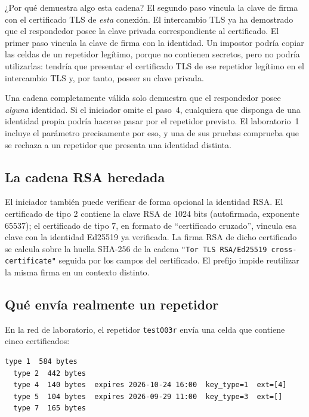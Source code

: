 ¿Por qué demuestra algo esta cadena? El segundo paso vincula la clave de firma con el certificado TLS de \emph{esta} conexión. El intercambio TLS ya ha demostrado que el respondedor posee la clave privada correspondiente al certificado. El primer paso vincula la clave de firma con la identidad. Un impostor podría copiar las celdas  de un repetidor legítimo, porque no contienen secretos, pero no podría utilizarlas: tendría que presentar el certificado TLS de ese repetidor legítimo en el intercambio TLS y, por tanto, poseer su clave privada.

\begin{attenzione}
Una cadena completamente válida solo demuestra que el respondedor posee \emph{alguna} identidad. Si el iniciador omite el paso~4, cualquiera que disponga de una identidad propia podría hacerse pasar por el repetidor previsto. El laboratorio~1 incluye el parámetro  precisamente por eso, y una de sus pruebas comprueba que se rechaza a un repetidor que presenta una identidad distinta.
\end{attenzione}

\subsection{La cadena RSA heredada}

El iniciador también puede verificar de forma opcional la identidad RSA. El certificado de tipo 2 contiene la clave RSA de 1024 bits (autofirmada, exponente 65537); el certificado de tipo 7, en formato de \enquote{certificado cruzado}, vincula esa clave con la identidad Ed25519 ya verificada. La firma RSA de dicho certificado se calcula sobre la huella SHA-256 de la cadena \texttt{"Tor TLS RSA/Ed25519 cross-certificate"} seguida por los campos del certificado. El prefijo impide reutilizar la misma firma en un contexto distinto.

\subsection{Qué envía realmente un repetidor}

En la red de laboratorio, el repetidor \texttt{test003r} envía una celda  que contiene cinco certificados:

\begin{lstlisting}[numbers=none]
  type 1  584 bytes
  type 2  442 bytes
  type 4  140 bytes  expires 2026-10-24 16:00  key_type=1  ext=[4]
  type 5  104 bytes  expires 2026-09-29 11:00  key_type=3  ext=[]
  type 7  165 bytes
\end{lstlisting}

